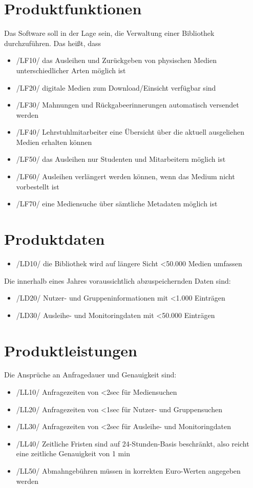 \documentclass[12pt, a4paper]{article}
\begin{document}
\section{Produktfunktionen}
Das Software soll in der Lage sein, die Verwaltung einer Bibliothek durchzuführen. Das heißt, dass
\begin{itemize}
	\item /LF10/ das Ausleihen und Zurückgeben von physischen Medien unterschiedlicher Arten möglich ist
	\item /LF20/ digitale Medien zum Download/Einsicht verfügbar sind
	\item /LF30/ Mahnungen und Rückgabeerinnerungen automatisch versendet werden
	\item /LF40/ Lehrstuhlmitarbeiter eine Übersicht über die aktuell ausgeliehen Medien erhalten können
	\item /LF50/ das Ausleihen nur Studenten und Mitarbeitern möglich ist
	\item /LF60/ Ausleihen verlängert werden können, wenn das Medium nicht vorbestellt ist
	\item /LF70/ eine Mediensuche über sämtliche Metadaten möglich ist
\end{itemize}

\section{Produktdaten}
\begin{itemize}
	\item /LD10/ die Bibliothek wird auf längere Sicht <50.000 Medien umfassen
\end{itemize}

Die innerhalb eines Jahres voraussichtlich abzuspeichernden Daten sind:
\begin{itemize}
	\item /LD20/ Nutzer- und Gruppeninformationen mit <1.000 Einträgen
	\item /LD30/ Ausleihe- und Monitoringdaten mit <50.000 Einträgen
\end{itemize}

\section{Produktleistungen}
Die Ansprüche an Anfragedauer und Genauigkeit sind:
\begin{itemize}
	\item /LL10/ Anfragezeiten von <2sec für Mediensuchen
	\item /LL20/ Anfragezeiten von <1sec für Nutzer- und Gruppensuchen
	\item /LL30/ Anfragezeiten von <2sec für Ausleihe- und Monitoringdaten
	\item /LL40/ Zeitliche Fristen sind auf 24-Stunden-Basis beschränkt, also reicht eine zeitliche Genauigkeit von 1 min
	\item /LL50/ Abmahngebühren müssen in korrekten Euro-Werten angegeben werden
\end{itemize}
\end{document}
